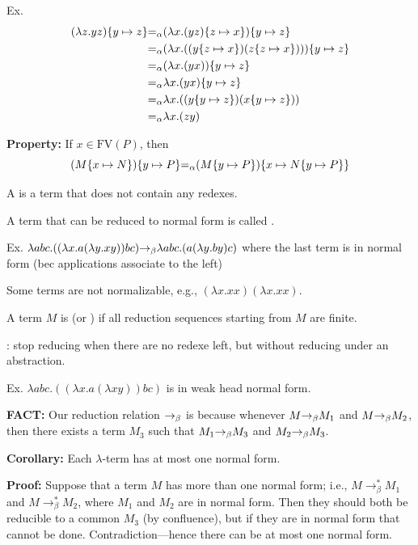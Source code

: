 \begin{frame}
Ex.
\begin{align*}
(\lambda z.yz)\{y\mapsto z\} 
&{=_\alpha} (\lambda x.(yz)\{z\mapsto x\})\{y\mapsto z\} \\
&{=_\alpha} (\lambda x.((y\{z\mapsto x\})(z\{z\mapsto x\})))\{y\mapsto z\} \\
&{=_\alpha} (\lambda x.(yx))\{y\mapsto z\} \\
&{=_\alpha} \lambda x.(yx)\{y\mapsto z\} \\
&{=_\alpha} \lambda x.((y\{y\mapsto z\})(x\{y\mapsto z\})) \\
&{=_\alpha} \lambda x.(zy)
\end{align*}

{\bf Property:} If $x\in\text{FV}(P)$, then
$$
(M\{x\mapsto N\})\{y\mapsto P\}{=_\alpha}
(M\{y\mapsto P\})\{x\mapsto N\{y\mapsto P\}\}
$$
\end{frame}

\begin{frame}
A  is a term that does not contain any redexes.

A term that can be reduced to normal form is called .

Ex. $\lambda abc.((\lambda x.a(\lambda y.xy))bc){\rightarrow_\beta}
\lambda abc.(a(\lambda y.by)c)$ where the last term is in normal form
(bec applications associate to the left)

Some terms are not normalizable, e.g., $(\lambda x.xx)(\lambda x.xx)$.

A term $M$ is  (or ) if all
reduction sequences starting from $M$ are finite.

: stop reducing when there are no redexe
left, but without reducing under an abstraction.

Ex. $\lambda abc.((\lambda x.a(\lambda xy))bc)$ is in weak head normal
form.
\end{frame}

\begin{frame}

{\bf FACT:} Our reduction relation ${\rightarrow_\beta}$ is  because
whenever $M{\rightarrow_\beta} M_1$ and $M{\rightarrow_\beta} M_2$, then there exists a term $M_3$
such that $M_1{\rightarrow_\beta} M_3$ and $M_2{\rightarrow_\beta} M_3$.

{\bf Corollary:} Each $\lambda$-term has at most one normal form.

{\bf Proof:} Suppose that a term $M$ has more than one normal form;
i.e., $M\rightarrow^*_\beta M_1$ and $M\rightarrow^*_\beta M_2$, where
$M_1$ and $M_2$ are in normal form.  Then they should both be
reducible to a common $M_3$ (by confluence), but if they are in normal
form that cannot be done.  Contradiction---hence there can be at most
one normal form.

\end{frame}

